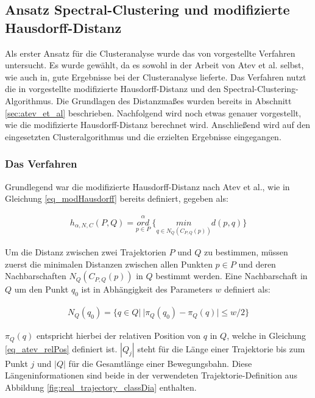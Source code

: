 \subsection{Ansatz Spectral-Clustering und modifizierte Hausdorff-Distanz}
\label{sec:real_ansatz_spec_modHD}

Als erster Ansatz für die Clusteranalyse wurde das von \cite[]{Atev2010} vorgestellte Verfahren untersucht.
Es wurde gewählt, da es sowohl in der Arbeit von Atev et al. selbst, wie auch in\cite[]{Morris2009}, gute Ergebnisse
bei der Clusteranalyse lieferte.
Das Verfahren nutzt die in \cite[]{Atev2006} vorgestellte modifizierte Hausdorff-Distanz und den
Spectral-Clustering-Algorithmus. Die Grundlagen des Distanzmaßes wurden bereits in Abschnitt
\ref{sec:atev_et_al} beschrieben. Nachfolgend wird noch etwas genauer vorgestellt, wie die
modifizierte Hausdorff-Distanz berechnet wird. Anschließend
wird auf den eingesetzten Clusteralgorithmus und die erzielten Ergebnisse eingegangen.

\subsubsection{Das Verfahren}

Grundlegend war die modifizierte Hausdorff-Distanz nach Atev et al., wie in Gleichung \ref{eq_modHausdorff}
bereits definiert, gegeben als:

\begin{ceqn}
\begin{align*}
    h_{\alpha, N, C}(P, Q) = \overset{\alpha}{\underset{p \in P}{ord}}\ \Big\{ \underset{q \in N_Q(C_{P,Q}(p))}{min} d(p, q) \Big\}
\end{align*}
\end{ceqn}

Um die Distanz zwischen zwei Trajektorien $P$ und $Q$ zu bestimmen, müssen zuerst die minimalen Distanzen
zwischen allen Punkten $p \in P$ und deren Nachbarschaften $N_Q(C_{P,Q}(p))$ in $Q$ bestimmt werden.
Eine Nachbarschaft in $Q$ um den Punkt $q_0$ ist in Abhängigkeit des Parameters $w$ definiert als:

\begin{ceqn}
\begin{align}
    N_Q(q_0) = \{ q \in Q |\ |\pi_Q(q_0) - \pi_Q(q)| \le w/2 \}
\end{align}
\end{ceqn}

$\pi_Q(q)$ entspricht hierbei der relativen Position von $q$ in $Q$, welche in Gleichung \ref{eq_atev_relPos} definiert ist.
$|Q_j|$ steht für die Länge einer Trajektorie bis zum Punkt $j$ und $|Q|$ für die Gesamtlänge einer Bewegungsbahn.
Diese Längeninformationen sind beide in der verwendeten Trajektorie-Definition aus Abbildung
\ref{fig:real_trajectory_classDia} enthalten.

